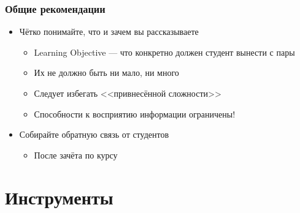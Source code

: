 \documentclass[xetex,mathserif,serif]{beamer}
\begin{document}
    \begin{frame}
        \frametitle{Общие рекомендации}
        \begin{itemize}
            \item Чётко понимайте, что и зачем вы рассказываете
            \begin{itemize}
                \item Learning Objective --- что конкретно должен студент вынести с пары
                \item Их не должно быть ни мало, ни много
                \item Следует избегать <<привнесённой сложности>>
                \item Способности к восприятию информации ограничены!
            \end{itemize}
            \item Собирайте обратную связь от студентов
            \begin{itemize}
                \item После зачёта по курсу
            \end{itemize}
        \end{itemize}
    \end{frame}

    \section{Инструменты}
\end{document}

